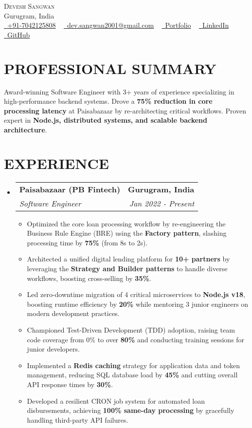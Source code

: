 \documentclass[letterpaper,11pt]{article}
\makeatletter
\newcommand{\resumeSubheading}[4]{
  \vspace{-2pt}\item
    \begin{tabular*}{1.0\textwidth}[t]{l@{\extracolsep{\fill}}r}
      \textbf{\large#1} & \textbf{\small #2} \\
      \textit{\large#3} & \textit{\small #4} \\
    \end{tabular*}\vspace{-7pt}
}
\newcommand{\resumeItem}[1]{
  \item\small{
    {#1 \vspace{-2pt}}
  }
}
\newcommand{\resumeSubHeadingListStart}{\begin{itemize}[leftmargin=0.0in, label={}]}
\newcommand{\resumeSubHeadingListEnd}{\end{itemize}}
\newcommand{\resumeItemListStart}{\begin{itemize}}
\newcommand{\resumeItemListEnd}{\end{itemize}\vspace{-5pt}}
\makeatother
\begin{document}
\begin{center}
    {\Huge \scshape Devesh Sangwan} \\ \vspace{1pt}
    Gurugram, India \\
    \small \href{tel:+91-7042125808}{\raisebox{-0.1\height}\faPhone~+91-7042125808} ~
    \href{mailto:dev.sangwan2001@gmail.com}{\raisebox{-0.2\height}\faEnvelope~dev.sangwan2001@gmail.com} ~
    \href{https://deveshsangwan.com}{\raisebox{-0.1\height}{\faGlobe}~Portfolio} ~
    \href{https://www.linkedin.com/in/deveshsangwan/}{\raisebox{-0.2\height}\faLinkedin~LinkedIn} ~
    \href{https://github.com/deveshsangwan}{\raisebox{-0.2\height}\faGithub~GitHub}
\end{center}


\section{PROFESSIONAL SUMMARY}
\vspace{-2pt}
\small{Award-winning Software Engineer with 3+ years of experience specializing in high-performance backend systems. Drove a \textbf{75\% reduction in core processing latency} at Paisabazaar by re-architecting critical workflows. Proven expert in \textbf{Node.js, distributed systems, and scalable backend architecture}.}


\section{EXPERIENCE}
  \resumeSubHeadingListStart
    \resumeSubheading
      {Paisabazaar (PB Fintech)}{Gurugram, India}
      {Software Engineer}{Jan 2022 - Present}
      \resumeItemListStart
        \resumeItem{Optimized the core loan processing workflow by re-engineering the Business Rule Engine (BRE) using the \textbf{Factory pattern}, slashing processing time by \textbf{75\%} (from 8s to 2s).}
        \resumeItem{Architected a unified digital lending platform for \textbf{10+ partners} by leveraging the \textbf{Strategy and Builder patterns} to handle diverse workflows, boosting cross-selling by \textbf{35\%}.}
        \resumeItem{Led zero-downtime migration of 4 critical microservices to \textbf{Node.js v18}, boosting runtime efficiency by \textbf{20\%} while mentoring 3 junior engineers on modern development practices.}
        \resumeItem{Championed Test-Driven Development (TDD) adoption, raising team code coverage from 0\% to over \textbf{80\%} and conducting training sessions for junior developers.}
        \resumeItem{Implemented a \textbf{Redis caching} strategy for application data and token management, reducing SQL database load by \textbf{45\%} and cutting overall API response times by \textbf{30\%}.}
        \resumeItem{Developed a resilient CRON job system for automated loan disbursements, achieving \textbf{100\% same-day processing} by gracefully handling third-party API failures.}
      \resumeItemListEnd
  \resumeSubHeadingListEnd
\end{document}
